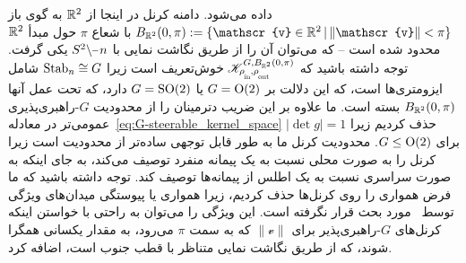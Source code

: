 داده می‌شود. دامنه کرنل در اینجا از $\mathbb{R}^2$ به گوی باز $B_{\R^2}(0,\pi) := \{ \mathscr{v}\in\R^2 \,|\, \lVert \mathscr{v}\rVert < \pi \}$ با شعاع $\pi$ حول مبدأ $\mathbb{R}^2$ محدود شده است -- که می‌توان آن را از طریق نگاشت نمایی با $S^2\backslash \mkern-1mu\minus\mkern1mu n$ یکی گرفت.
توجه داشته باشید که $\mathscr{K}^{G,B_{\R^2}(0,\pi)}_{\rhoin\mkern-1mu,\rhoout}$ خوش‌تعریف است زیرا $\operatorname{Stab}_{n} \cong G$ شامل ایزومتری‌ها است، که این دلالت بر $G=\operatorname{O}(2)$ یا $G=\operatorname{SO}(2)$ دارد، که تحت عمل آنها $B_{\mathbb{R}^2}(0,\pi)$ بسته است.
ما علاوه بر این ضریب دترمینان را از محدودیت $G$-راهبری‌پذیری عمومی‌تر در معادله~\eqref{eq:G-steerable_kernel_space} حذف کردیم زیرا ${|\!\det g| = 1}$ برای $G\leq\operatorname{O}(2)$.
محدودیت کرنل ما به طور قابل توجهی ساده‌تر از محدودیت \citet{Cohen2019-generaltheory} است زیرا کرنل را به صورت محلی نسبت به یک پیمانه منفرد توصیف می‌کند، به جای اینکه به صورت سراسری نسبت به یک اطلس از پیمانه‌ها توصیف کند.
توجه داشته باشید که ما فرض همواری را روی کرنل‌ها حذف کردیم، زیرا همواری یا پیوستگی میدان‌های ویژگی توسط~\citet{Cohen2019-generaltheory} مورد بحث قرار نگرفته است.
این ویژگی را می‌توان به راحتی با خواستن اینکه کرنل‌های $G$-راهبری‌پذیر برای $\lVert\mathscr{v}\rVert$ که به سمت $\pi$ می‌رود، به مقدار یکسانی همگرا شوند، که از طریق نگاشت نمایی متناظر با قطب جنوب است، اضافه کرد.


